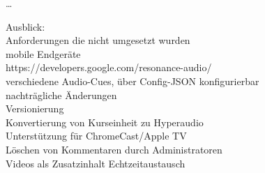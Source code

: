 \dots


Ausblick:\\
Anforderungen die nicht umgesetzt wurden\\
mobile Endgeräte\\
https://developers.google.com/resonance-audio/\\
verschiedene Audio-Cues, über Config-JSON konfigurierbar\\
nachträgliche Änderungen\\
Versionierung\\
Konvertierung von Kurseinheit zu Hyperaudio\\
Unterstützung für ChromeCast/Apple TV\\
Löschen von Kommentaren durch Administratoren\\
Videos als Zusatzinhalt
Echtzeitaustausch